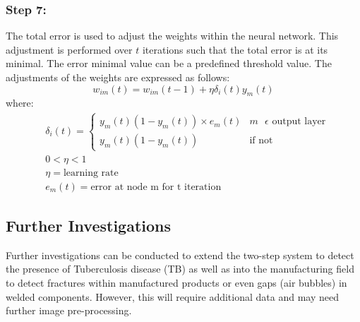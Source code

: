 \documentclass[11pt,twocolumn]{witseiepaper}
\begin{document}
	\subsubsection{Step 7:}
	The total error is used to adjust the weights within the neural network. This adjustment is performed over $t$ iterations such that the total error is at its minimal. The error minimal value can be a predefined threshold value. The adjustments of the weights are expressed as follows:
	\begin{equation}
		w_{im}(t) = w_{im}(t-1)+\eta\delta_i(t)y_m(t)
	\end{equation}
	where:
	\begin{align*}
		& \delta_i(t) = 
		\begin{cases}
			y_m(t)(1 - y_m(t))\times e_m(t) & m \text{ } \epsilon \text{ output layer}\\
			y_m(t)(1 - y_m(t)) & \text{if not}
		\end{cases} \\
		& 0 < \eta < 1 \\
		& \eta = \text{learning rate} \\
		& e_m(t) = \text{error at node m for t iteration}
	\end{align*}
	
	\subsection{Further Investigations}
	Further investigations can be conducted to extend the two-step system to detect the presence of Tuberculosis disease (TB) as well as into the manufacturing field to detect fractures within manufactured products or even gaps (air bubbles) in welded components. However, this will require additional data and may need further image pre-processing. 
	
\end{document}

